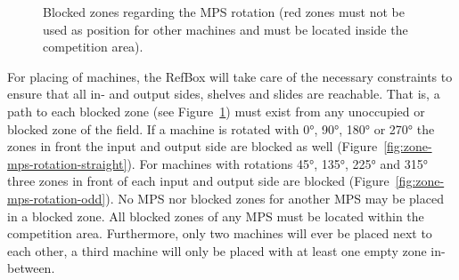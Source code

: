 \documentclass[12pt,twoside]{article}
\newcommand{\reffig}[1]{Figure~\ref{#1}}
\begin{document}
\begin{figure}[t!]
    \centering
    \quad
    \caption{
      Blocked zones regarding the MPS rotation (red zones must not be used as
      position for other machines and must be located inside the competition
      area).
    }
    \label{fig:zone-mps-blocked}
\end{figure}
For placing of machines, the RefBox will take care of the necessary constraints
to ensure that all in- and output sides, shelves and slides are reachable. That
is, a path to each blocked zone (see \reffig{fig:zone-mps-blocked}) must exist
from any unoccupied or blocked zone of the field. If a machine is rotated with
\ang{0}, \ang{90}, \ang{180} or \ang{270} the zones in front the input and
output side are blocked as well (\reffig{fig:zone-mps-rotation-straight}).  For
machines with rotations \ang{45}, \ang{135}, \ang{225} and \ang{315} three zones
in front of each input and output side are blocked
(\reffig{fig:zone-mps-rotation-odd}). No MPS nor blocked zones for another MPS
may be placed in a blocked zone. All blocked zones of any MPS must be located
within the competition area. Furthermore, only two machines will ever be placed
next to each other, a third machine will only be placed with at least one empty
zone in-between.
\end{document}
